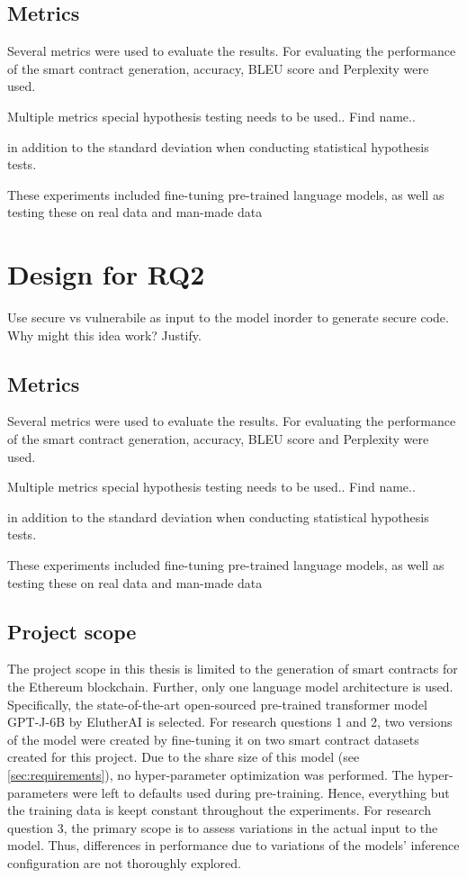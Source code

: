 \subsection{Metrics}

Several metrics were used to evaluate the results. For evaluating the performance of the smart contract generation, accuracy, BLEU score and Perplexity were used. 

Multiple metrics special hypothesis testing needs to be used.. Find name..

in addition to the standard deviation when conducting statistical hypothesis tests.

These experiments included fine-tuning pre-trained language models, as well as testing these on real data and man-made data




\section{Design for RQ2}
\label{sec:design-for-rq2}
Use secure vs vulnerabile as input to the  model inorder to generate secure code. 
Why might this idea work? Justify.


\subsection{Metrics}

Several metrics were used to evaluate the results. For evaluating the performance of the smart contract generation, accuracy, BLEU score and Perplexity were used. 

Multiple metrics special hypothesis testing needs to be used.. Find name..

in addition to the standard deviation when conducting statistical hypothesis tests.

These experiments included fine-tuning pre-trained language models, as well as testing these on real data and man-made data


\subsection{Project scope}
\label{sec:project-scope}

The project scope in this thesis is limited to the generation of smart contracts for the Ethereum blockchain. Further, only one language model architecture is used. Specifically, the state-of-the-art open-sourced pre-trained transformer model GPT-J-6B by ElutherAI is selected. For research questions 1 and 2, two versions of the model were created by fine-tuning it on two smart contract datasets created for this project. Due to the share size of this model (see \cref{sec:requirements}), no hyper-parameter optimization was performed. The hyper-parameters were left to defaults used during pre-training. Hence, everything but the training data is keept constant throughout the experiments. For research question 3, the primary scope is to assess variations in the actual input to the model. Thus, differences in performance due to variations of the models' inference configuration are not thoroughly explored.




